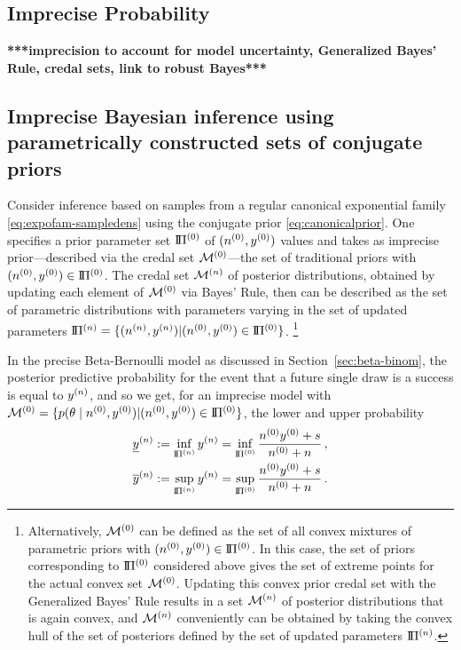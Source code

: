 \subsection{Imprecise Probability}

\textbf{***imprecision to account for model uncertainty, Generalized Bayes' Rule, credal sets, link to robust Bayes***}


\subsection{Imprecise Bayesian inference using parametrically constructed sets of conjugate priors}
\label{sec:ip-conjugateframework}

Consider inference based on samples from a regular canonical exponential family \eqref{eq:expofam-sampledens}
using the conjugate prior \eqref{eq:canonicalprior}.
One specifies a prior parameter set $\text{I}\!\Pi^{(0)}$ of $(n^{(0)},y^{(0)})$ values
and takes as imprecise prior---described via the credal set $\mathcal{M}^{(0)}$---the set of traditional priors with $(n^{(0)}, y^{(0)}) \in \text{I}\!\Pi^{(0)}$.
The credal set $\mathcal{M}^{(n)}$ of posterior distributions,
obtained by updating each element of $\mathcal{M}^{(0)}$ via Bayes' Rule,
then can be described as the set of parametric distributions
with parameters varying in the set of updated parameters $\text{I}\!\Pi^{(n)} = \{(n^{(n)},y^{(n)}) \vert (n^{(0)}, y^{(0)}) \in \text{I}\!\Pi^{(0)}\}$.%
\footnote{Alternatively, $\mathcal{M}^{(0)}$ can be defined as the set of all convex mixtures of parametric priors with $(n^{(0)}, y^{(0)}) \in \text{I}\!\Pi^{(0)}$.
In this case, the set of priors corresponding to $\text{I}\!\Pi^{(0)}$ considered above gives the set of extreme points for the actual convex set $\mathcal{M}^{(0)}$.
Updating this convex prior credal set with the Generalized Bayes' Rule results in a set $\mathcal{M}^{(n)}$ of posterior distributions that is again convex,
and $\mathcal{M}^{(n)}$ conveniently can be obtained by taking the convex hull of the set of posteriors
defined by the set of updated parameters $\text{I}\!\Pi^{(n)}$.}

In the precise Beta-Bernoulli model as discussed in Section~\ref{sec:beta-binom},
the posterior predictive probability %
for the event that a future single draw is a success is equal to $y^{(n)}$, and so we get,
for an imprecise model with $\mathcal{M}^{(0)} = \{p(\theta\mid n^{(0)}, y^{(0)}) \vert (n^{(0)}, y^{(0)}) \in \text{I}\!\Pi^{(0)}\}$,
the lower and upper probability
\begin{align*}
\underline{y}^{(n)} &:= \inf_{\text{I}\!\Pi^{(n)}} y^{(n)} = \inf_{\text{I}\!\Pi^{(0)}} \frac{n^{(0)}y^{(0)} + s}{n^{(0)} +n}\,, \\
\overline{y}^{(n)} &:= \sup_{\text{I}\!\Pi^{(n)}} y^{(n)} = \sup_{\text{I}\!\Pi^{(0)}} \frac{n^{(0)}y^{(0)} + s}{n^{(0)} +n}\,.
\end{align*}

